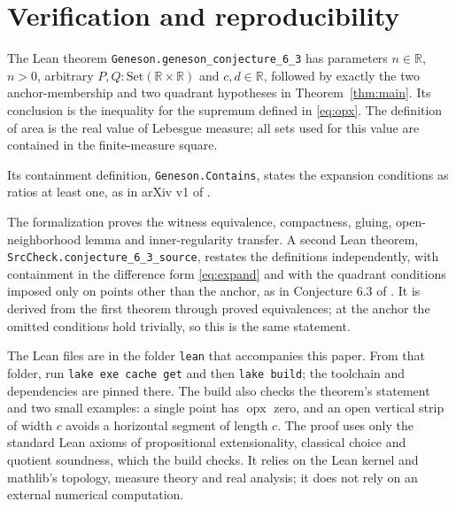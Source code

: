 \documentclass[11pt]{article}
\DeclareMathOperator{\opx}{opx}
\newcommand{\R}{\mathbb R}
\begin{document}
\section{Verification and reproducibility}\label{sec:verify}
The Lean theorem \texttt{Geneson.geneson\_conjecture\_6\_3} has parameters $n\in\R$, $n>0$, arbitrary $P,Q:\mathrm{Set}(\R\times\R)$ and $c,d\in\R$, followed by exactly the two anchor-membership and two quadrant hypotheses in Theorem~\ref{thm:main}. Its conclusion is the inequality for the supremum defined in \eqref{eq:opx}. The definition of area is the real value of Lebesgue measure; all sets used for this value are contained in the finite-measure square.

Its containment definition, \texttt{Geneson.Contains}, states the expansion conditions as ratios at least one, as in arXiv v1 of \cite{Geneson}.

The formalization proves the witness equivalence, compactness, gluing, open-neighborhood lemma and inner-regularity transfer. A second Lean theorem, \texttt{SrcCheck.conjecture\_6\_3\_source}, restates the definitions independently, with containment in the difference form \eqref{eq:expand} and with the quadrant conditions imposed only on points other than the anchor, as in Conjecture 6.3 of \cite{Geneson}. It is derived from the first theorem through proved equivalences; at the anchor the omitted conditions hold trivially, so this is the same statement.

The Lean files are in the folder \texttt{lean} that accompanies this paper. From that folder, run \texttt{lake exe cache get} and then \texttt{lake build}; the toolchain and dependencies are pinned there. The build also checks the theorem's statement and two small examples: a single point has $\opx$ zero, and an open vertical strip of width $c$ avoids a horizontal segment of length $c$. The proof uses only the standard Lean axioms of propositional extensionality, classical choice and quotient soundness, which the build checks. It relies on the Lean kernel and mathlib's topology, measure theory and real analysis; it does not rely on an external numerical computation.
\end{document}
